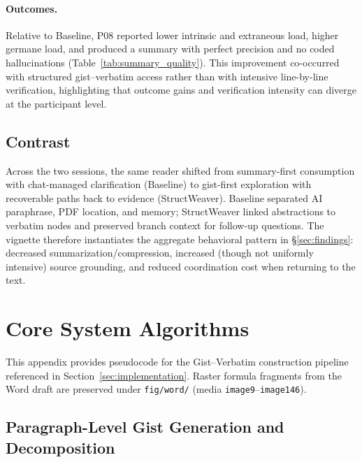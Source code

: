 \documentclass[manuscript,review,anonymous]{acmart}
\begin{document}
\paragraph{Outcomes.}
Relative to Baseline, P08 reported lower intrinsic and extraneous load, higher germane load, and produced a summary with perfect precision and no coded hallucinations (Table~\ref{tab:summary_quality}). This improvement co-occurred with structured gist--verbatim access rather than with intensive line-by-line verification, highlighting that outcome gains and verification intensity can diverge at the participant level.

\subsection{Contrast}

Across the two sessions, the same reader shifted from summary-first consumption with chat-managed clarification (Baseline) to gist-first exploration with recoverable paths back to evidence (StructWeaver). Baseline separated AI paraphrase, PDF location, and memory; StructWeaver linked abstractions to verbatim nodes and preserved branch context for follow-up questions. The vignette therefore instantiates the aggregate behavioral pattern in \S\ref{sec:findings}: decreased summarization/compression, increased (though not uniformly intensive) source grounding, and reduced coordination cost when returning to the text.

\section{Core System Algorithms}
\label{sec:appendix-algorithms}

This appendix provides pseudocode for the Gist--Verbatim construction pipeline referenced in Section~\ref{sec:implementation}. Raster formula fragments from the Word draft are preserved under \texttt{fig/word/} (media \texttt{image9}--\texttt{image146}).

\subsection{Paragraph-Level Gist Generation and Decomposition}
\end{document}
